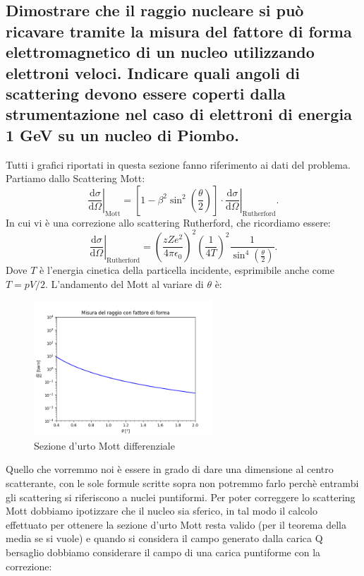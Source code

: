 \subsection[]{Dimostrare che il raggio nucleare si può ricavare tramite la misura del fattore di forma elettromagnetico di un nucleo utilizzando elettroni veloci. Indicare quali angoli di scattering devono essere coperti dalla strumentazione nel caso di elettroni di energia 1 GeV su un nucleo di Piombo.}%
\label{sec:5.c.36}
Tutti i grafici riportati in questa sezione fanno riferimento ai dati del problema.\\
Partiamo dallo Scattering Mott:
\[
	\left.\frac{\mbox{d}\sigma }{\mbox{d} \Omega} \right|_{\text{Mott}} = 
		\left[ 1- \beta^2 \sin^2\left( \frac{\theta}{2} \right) \right]\cdot \left.\frac{\mbox{d} \sigma}{\mbox{d} \Omega} \right|_{\text{Rutherford}} 
.\] 
In cui vi è una correzione allo scattering Rutherford, che ricordiamo essere:
\[
	\left.\frac{\mbox{d} \sigma}{\mbox{d} \Omega} \right|_{\text{Rutherford}}= \left( \frac{zZe^2}{4\pi\epsilon_0} \right)^2\left( \frac{1}{4T} \right)^2 
		\frac{1}{\sin^4\left( \frac{\theta}{2} \right) }
.\] 
Dove $T$ è l'energia cinetica della particella incidente, esprimibile anche come $T = pV /2$.
L'andamento del Mott al variare di $\theta$ è:
\begin{figure}[H]
	\centering
	\includegraphics[width=0.6\textwidth]{immagini/Mott.png}
	\caption{Sezione d'urto Mott differenziale}
	\label{fig:immagini-Mott-png}
\end{figure}
Quello che vorremmo noi è essere in grado di dare una dimensione al centro scatterante, con le sole formule scritte sopra non potremmo farlo perchè entrambi gli scattering si riferiscono a nuclei puntiformi. Per poter correggere lo scattering Mott dobbiamo ipotizzare che il nucleo sia sferico, in tal modo il calcolo effettuato per ottenere la sezione d'urto Mott resta valido (per il teorema della media se si vuole) e quando si considera il campo generato dalla carica Q bersaglio dobbiamo considerare il campo di una carica puntiforme con la correzione: 
